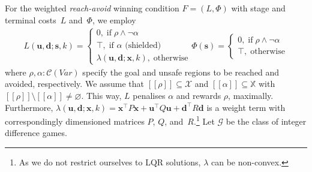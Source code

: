 \documentclass{article}
\newcommand\mfBPXHb[1]{#1^\intercal}
\newcommand\mGctqYz[1][X]{\mathcal{C}(#1)}
\newcommand\mcrHMQW[1]{[\![#1]\!]}
\renewcommand\vec[1]{\mathbf{#1}}
\begin{document}
{For the weighted \emph{reach-avoid} winning condition
$F=(L,\Phi)$ with
stage 
and terminal costs~$L$ and~$\Phi$, we employ
\begin{align}
  \label{l:4}
  L({\vec{u}},{\vec{d}};{\vec{s}},k) =
  \begin{cases}
    0,\;\text{if}\;\rho\land\neg\alpha
    \\
    \top,\;\text{if $\alpha$ (shielded)}
    \\
    \lambda({\vec{u}},{\vec{d}};{\vec{x}},k)
    ,\;\text{otherwise}
  \end{cases}
  \Phi({\vec{s}}) =
  \begin{cases}
    0,\;\text{if}\;\rho\land\neg\alpha\\
    \top,\; \text{otherwise}
  \end{cases}
\end{align}
where $\rho,\alpha\colon\mGctqYz[\mathit{Var}]$ specify the goal
and unsafe regions to be reached and avoided, respectively.  We assume
that $\mcrHMQW\rho\subseteq\mathcal{X}$ and
$\mcrHMQW\alpha\subseteq{\mathbb{X}}$ with
$\mcrHMQW\rho\setminus\mcrHMQW\alpha\neq\varnothing$.
This way, $L$ penalises $\alpha$ and rewards $\rho$,
maximally.  Furthermore,
$\lambda({\vec{u}},{\vec{d}};{\vec{x}},k) = \mfBPXHb{\vec{x}}
P{\vec{x}} + \mfBPXHb{\vec{u}} Q{\vec{u}} + \mfBPXHb{\vec{d}} R{\vec{d}}$ is a
weight term with correspondingly dimensioned matrices $P$, $Q$,
and~$R$.\footnote{As we do not restrict ourselves to 
  LQR 
  solutions, $\lambda$ can be non-convex.} 
Let $\mathcal{G}$ be the class of integer difference games.

}
\end{document}
